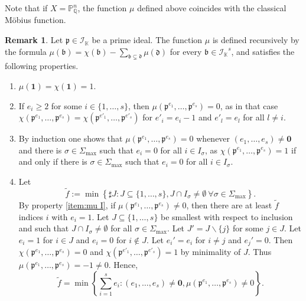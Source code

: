\documentclass[10pt, a4paper, reqno, english]{amsart}
\newcommand\QQ{\mathbb{Q}}
\newcommand{\KK}{\mathbb{K}} %
\newcommand\PP{\mathbb{P}} %
\newcommand{\ideals}{{\mathcal I_{\KK}}} %
\theoremstyle{definition}
\newtheorem{remark}[theorem]{Remark}
\numberwithin{theorem}{section}
\numberwithin{equation}{section}
\begin{document}
Note that if $X=\PP^n_\QQ$, the function $\mu$ defined above coincides with the classical M\"obius function.

\begin{remark} \label{rem:mu}
Let $\mathfrak p\in\mathcal I_{\KK}$ be a prime ideal.
The function $\mu$ is defined recursively by the formula $\mu(\mathfrak b)=\chi(\mathfrak b)-\sum_{\mathfrak b\subsetneq\mathfrak d}\mu(\mathfrak d)$ for every $\mathfrak b\in\ideals^s$, and satisfies the following properties. 
\begin{enumerate}[label=(\roman*), ref=(\roman*)]
\item $\mu(\mathbf 1)=\chi(\mathbf 1)=1$. 
\label{item:mu 1}
\item If $e_i\geq 2$ for some $i\in\{1,\dots,s\}$, then $\mu(\mathfrak p^{e_1},\dots,\mathfrak p^{e_s})=0$, as in that case $\chi(\mathfrak p^{e_1},\dots,\mathfrak p^{e_s})=\chi(\mathfrak p^{e'_1},\dots,\mathfrak p^{e'_s})$ for $e'_i=e_i-1$ and $e'_l=e_l$ for all $l\neq i$. 
\label{item:mu geq2}
\item By induction one shows that $\mu(\mathfrak p^{e_1},\dots,\mathfrak p^{e_s})=0$ whenever $(e_1,\dots,e_s)\neq\mathbf 0$ and there is $\sigma\in\Sigma_{\max}$ such that $e_i=0$ for all $i\in I_\sigma$, as $\chi(\mathfrak p^{e_1},\dots,\mathfrak p^{e_s})=1$ if and only if there is $\sigma\in\Sigma_{\max}$ such that $e_i=0$ for all $i\in I_\sigma$. 
\label{item:mu I}
\item \label{item: mu tildef}
Let 
$$\tilde f:= \min\left \{\sharp J: J\subseteq\{1,\dots, s\}, J\cap I_\sigma\neq\emptyset \ \forall \sigma\in\Sigma_{\max} \right \}.$$ By property \ref{item:mu I}, if $\mu(\mathfrak p^{e_1},\dots,\mathfrak p^{e_s})\neq0$, then there are at least $\tilde f$ indices $i$ with $e_i=1$.
Let $J\subseteq\{1,\dots,s\}$ be smallest with respect to inclusion and such that $J\cap I_\sigma\neq\emptyset$ for all $\sigma\in\Sigma_{\max}$. Let $J'=J\smallsetminus\{j\}$ for some $j\in J$. 
Let $e_i=1$ for $i\in J$ and $e_i=0$ for $i\notin J$. Let $e_i'=e_i$ for $i\neq j$ and $e_j'=0$. Then $\chi(\mathfrak p^{e_1},\dots,\mathfrak p^{e_s})=0$ and $\chi(\mathfrak p^{e'_1},\dots,\mathfrak p^{e'_s})=1$ by minimality of $J$. Thus $\mu(\mathfrak p^{e_1},\dots,\mathfrak p^{e_s})=-1\neq0$. Hence, 
\begin{equation}
\tilde f=\min \left \{\sum_{i=1}^se_i: (e_1,\dots,e_s)\neq\mathbf 0, \mu(\mathfrak p^{e_1},\dots,\mathfrak p^{e_s})\neq0\right \}.
\label{eq:mu tildef}
\end{equation}
\end{enumerate}
\end{remark}
\end{document}
